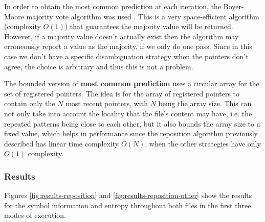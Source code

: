 \documentclass{article}
\begin{document}
In order to obtain the most common prediction at each iteration, the Boyer-Moore majority vote algorithm was used \cite{majority}.
This is a very space-efficient algorithm (complexity $O(1)$) that guarantees the majority value will be returned.
However, if a majority value doesn't actually exist then the algorithm may erroneously report a value as the majority, if we only do one pass.
Since in this case we don't have a specific disambiguation strategy when the pointers don't agree, the choice is arbitrary and thus this is not a problem.

The bounded version of \textbf{most common prediction} uses a circular array for the set of registered pointers.
The idea is for the array of registered pointers to contain only the $N$ most recent pointers, with $N$ being the array size.
This can not only take into account the locality that the file's content may have, i.e. the repeated patterns being close to each other, but it also bounds the array size to a fixed value, which helps in performance since the reposition algorithm previously described has linear time complexity $O(N)$, when the other strategies have only $O(1)$ complexity.

\subsubsection{Results}

Figures \ref{fig:results-reposition} and \ref{fig:results-reposition-other} show the results for the symbol information and entropy throughout both files in the first three modes of execution.
\end{document}
